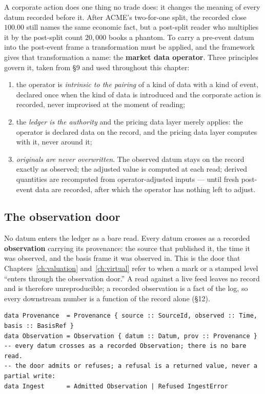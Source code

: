 A corporate action does one thing no trade does: it changes the meaning of every datum
recorded before it. After ACME's two-for-one split, the recorded close $100.00$ still
names the same economic fact, but a post-split reader who multiplies it by the post-split
count $20{,}000$ books a phantom. To carry a pre-event datum into the post-event frame a
transformation must be applied, and the framework gives that transformation a name: the
\textbf{market data operator}. Three principles govern it, taken from \S 9 and used
throughout this chapter:

\begin{enumerate}[label=(\roman*),nosep,leftmargin=2.2em]
\item the operator is \emph{intrinsic to the pairing} of a kind of data with a kind of
  event, declared once when the kind of data is introduced and the corporate action is
  recorded, never improvised at the moment of reading;
\item the \emph{ledger is the authority} and the pricing data layer merely applies: the
  operator is declared data on the record, and the pricing data layer computes with it,
  never around it;
\item \emph{originals are never overwritten}. The observed datum stays on the record
  exactly as observed; the adjusted value is computed at each read; derived quantities are
  recomputed from operator-adjusted inputs --- until fresh post-event data are recorded,
  after which the operator has nothing left to adjust.
\end{enumerate}

\subsection{The observation door}\label{sec:obs-door}

No datum enters the ledger as a bare read. Every datum crosses as a recorded
\textbf{observation} carrying its provenance: the source that published it, the time it
was observed, and the basis frame it was observed in. This is the door that
Chapters~\ref{ch:valuation} and~\ref{ch:virtual} refer to when a mark or a stamped level
``enters through the observation door.'' A read against a live feed leaves no record and
is therefore unreproducible; a recorded observation is a fact of the log, so every
downstream number is a function of the record alone (\S 12).

\begin{lstlisting}
data Provenance  = Provenance { source :: SourceId, observed :: Time, basis :: BasisRef }
data Observation = Observation { datum :: Datum, prov :: Provenance }
-- every datum crosses as a recorded Observation; there is no bare read.
-- the door admits or refuses; a refusal is a returned value, never a partial write:
data Ingest      = Admitted Observation | Refused IngestError
\end{lstlisting}

